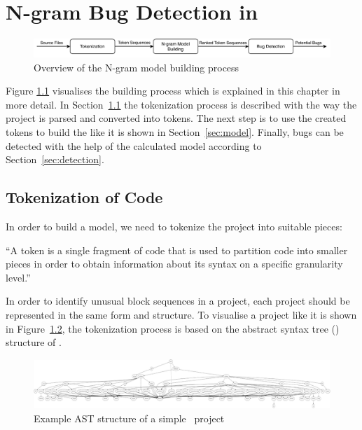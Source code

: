 \chapter{N-gram Bug Detection in \scratch{}}\label{chap:methods}

\begin{figure}[hbtp]
\centering
\includegraphics[scale=0.75]{images/Overview.pdf}
\caption{Overview of the N-gram model building process}
\label{fig:overview}
\end{figure}

Figure \ref{fig:overview} visualises the \ngram{} building process which is explained in this chapter in more detail. In Section~\ref{sec:tokenization} the tokenization process is described with the way the \scratch{} project is parsed and converted into tokens. The next step is to use the created tokens to build the \ngram{} like it is shown in Section~\ref{sec:model}. Finally, bugs can be detected with the help of the calculated model according to Section~\ref{sec:detection}.

\section{Tokenization of \scratch{} Code}\label{sec:tokenization}
In order to build a model, we need to tokenize the \scratch{} project into suitable pieces:

\begin{definition}[Token]\label{def:token}
    ``A token is a single fragment of \scratch{} code that is used to partition code into smaller pieces in order to obtain information about its syntax on a specific granularity level.''
\end{definition}

In order to identify unusual block sequences in a \scratch{} project, each project should be represented in the same form and structure. To visualise a \scratch{} project like it is shown in Figure~\ref{fig:ast}, the tokenization process is based on the abstract syntax tree (\AST{}) structure of \litterbox{}. 

\begin{figure}[hbtp]
\centering
\includegraphics[scale=0.20]{images/AST_example(3).png}
\caption{Example AST structure of a simple \scratch\ project}
\label{fig:ast}
\end{figure}


